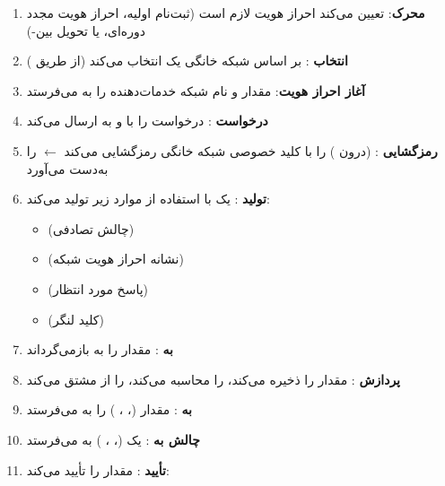 \begin{enumerate}
\def\labelenumi{\arabic{enumi}.}
\tightlist
\item
  \textbf{محرک}:  تعیین می‌کند احراز هویت لازم است (ثبت‌نام اولیه، احراز هویت مجدد دوره‌ای، یا تحویل بین-)
\item
  \textbf{انتخاب }:  بر اساس شبکه خانگی  یک  انتخاب می‌کند (از طریق )
\item
  \textbf{آغاز احراز هویت}:  مقدار  و نام شبکه خدمات‌دهنده  را به  می‌فرستد
\item
  \textbf{درخواست }:  درخواست را با  و  به  ارسال می‌کند
\item
  \textbf{رمزگشایی }:  (درون )  را با کلید خصوصی شبکه خانگی رمزگشایی می‌کند \ensuremath{\leftarrow}  را به‌دست می‌آورد
\item
  \textbf{تولید }:  یک  با استفاده از موارد زیر تولید می‌کند:

  \begin{itemize}
  \tightlist
  \item
     (چالش تصادفی)
  \item
     (نشانه احراز هویت شبکه)
  \item
     (پاسخ مورد انتظار)
  \item
     (کلید لنگر)
  \end{itemize}
\item
  \textbf{ به }:  مقدار  را به  بازمی‌گرداند
\item
  \textbf{پردازش }:  مقدار  را ذخیره می‌کند،  را محاسبه می‌کند،  را از  مشتق می‌کند
\item
  \textbf{ به }:  مقدار  (، ، ) را به  می‌فرستد
\item
  \textbf{چالش به }:  یک  (، ، ) به  می‌فرستد
\item
  \textbf{تأیید }:  مقدار  را تأیید می‌کند:


\end{enumerate}
